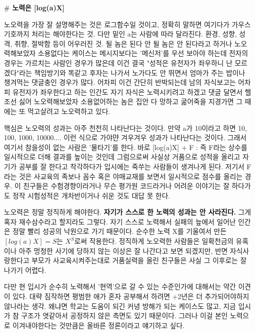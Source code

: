 \textbf{$\#$ 노력은 [log(a)X]}
\vspace{5mm}

노오력을 가장 잘 설명해주는 것은 로그함수일 것이고, 정확히 말하면 여기다가 가우스 기호까지 처리는 해야한다는 것.
다만 밑인 a는 사람에 따라 달라진다. 환경, 성향, 성격, 취향, 절박함 등이 어우러진 것.
될 놈은 된다 안 될 놈은 안 된다라고 하거나
노오력해보았자 소용없다는 케이스는 메시지보다는 '메신저'를 우선 보아야 하는데
전자의 경우는 가르치는 사람인 경우가 많은데 이건 결국 "성적은 유전자가 좌우하니 난 모르겠다"라는 책임방기와 똑같고
후자는 나가서 노가다도 안 뛰면서 엄마가 주는 밥이나 챙겨먹는 댓글충인 경우가 많다.
어차피 이건 간단히 반박되는데 남의 자식보고는 어차피 유전자가 좌우한다고 하는 인간도 자기 자식은 노력시키려고 하겠고
댓글 달면서 헬조선 싫어 노오력해보았자 소용없어하는 놈은 집안 다 망하고 굶어죽을 지경가면 그 때에는 또 먹고살려고 노오력하고 있다.
\vspace{5mm}

핵심은 노오력의 성과는 아주 천천히 나타난다는 것이다.
만약 a가 10이라고 하면 10, 100, 1000, 10000.... 이런 식으로 가야먄 겨우겨우 성과가 나타난다는 것이다.
그래서 여기서 참을성이 없는 사람은 '물타기'를 한다. 바로 [log(a)X] + F : 즉 F라는 상수를 일시적으로 더해 결과를 높이는 것인데
그럼으로써 사실상 거품으로 성적을 올리고 자기가 공부를 잘 한다고 착각하다가 입시에는 죽쑤는 사람들이 생겨나게 된다.
저기서 F라는 것은 사교육의 족보나 꼼수 혹은 야매교재를 보면서 일시적으로 점수를 올리는 경우.
이 친구들은 수험경향이라거나 무슨 평가원 코드라거나 어려운 이야기는 잘 하다가도 정작 시험성적은 개차반이거나 쉬운 것도 대답 못 한다.
\vspace{5mm}

노오력은 정말 정직하게 해야한다. \textbf{자기가 스스로 한 노력의 성과는 안 사라진다.}
그게 혹자 재수삼수라고 할지라도 그렇다. 자기 스스로 노력해서 실패의 늪에서 일어난 인간은 정말 빨리 성공의 낙원으로 가기 때문이다.
순수한 노력 X를 기울여서 만든 $[log(a)X]=S$는 $X^S$로써 작용한다.
정직하게 노오력한 사람들은 일확천금의 유혹이나 아주 멍청한 사기에 당하지 않는 이상은 잘 나간다고 보면 되겠지만,
반면 자식사랑한다고 부모가 사교육시켜주는대로 거품실력을 올린 친구들은 사실 그 이후로는 잘 나가기 어렵다.
\vspace{5mm}

다만 현 입시가 순수히 노력해서 '현역'으로 갈 수 있는 수준인가에 대해서는 약간 이견이 있다.
대략 짐작하면 평범한 애가 혼자 공부해서 하려면 +2년은 더 추가되어야하지 않나라는 생각.
왜냐면 학교는 도움이 되긴 커녕 방해가 되는 케이스도 많고, 지금 입시가 참 구조가 엿같아서 공정하지 않은 측면도 있기 때문이다.
그러나 이걸 본인 노력으로 이겨내야한다는 것만큼은 올바른 정론이라고 얘기하고 싶다.
\vspace{5mm}

